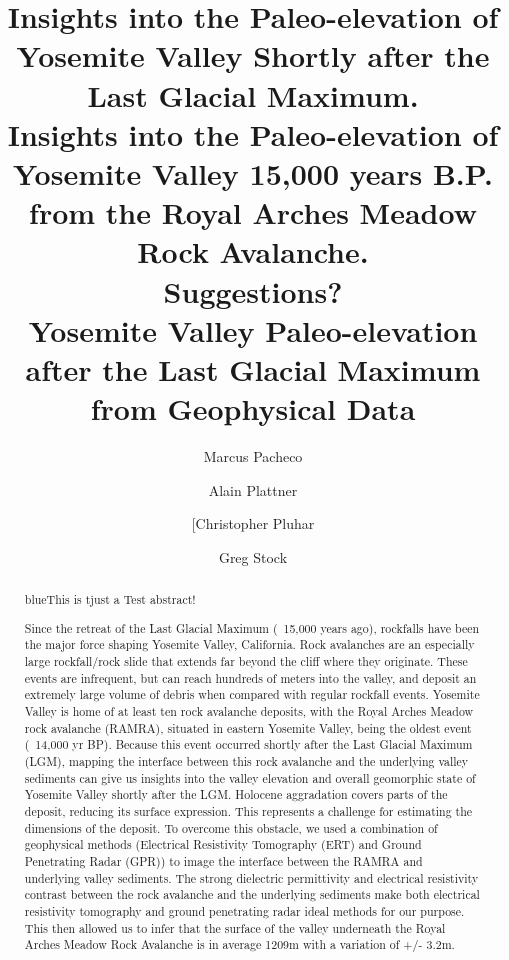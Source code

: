 \documentclass[5p]{elsarticle}
\newcommand{\COMON}{\begin{color}{blue}}
\newcommand{\COMOFF}{\end{color}}
\begin{document}
	\begin{frontmatter}

\title{Insights into the Paleo-elevation of Yosemite Valley Shortly after the Last Glacial Maximum.\\ \vspace{1cm}Insights into the Paleo-elevation of Yosemite Valley 15,000 years B.P. from the Royal Arches Meadow Rock Avalanche.\\ \vspace{1cm}Suggestions?\\ \vspace{1m}  Yosemite Valley Paleo-elevation  after the Last Glacial Maximum from Geophysical Data}

\author[Marcus]{Marcus Pacheco}
\address[Marcus]{California State University, Fresno}

\author[Alain]{Alain Plattner}
\address[Alain]{University of Alabama}

\author[Chris]{[Christopher Pluhar}
\address[Chris]{California State University, Fresno}

\author[Greg]{Greg Stock}
\address[Greg]{Yosemite National Park}



										\begin{abstract}
										
\COMON This is tjust a Test abstract!\COMOFF Since the retreat of the Last Glacial Maximum (~15,000 years ago), rockfalls have been the major force shaping Yosemite Valley, California. Rock avalanches are an especially large rockfall/rock slide that extends far beyond the cliff where they originate. These events are infrequent, but can reach hundreds of meters into the valley, and deposit an extremely large volume of debris when compared with regular rockfall events. Yosemite Valley is home of at least ten rock avalanche deposits, with the Royal Arches Meadow rock avalanche (RAMRA), situated in eastern Yosemite Valley, being the oldest event (~14,000 yr BP). Because this event occurred shortly after the Last Glacial Maximum (LGM), mapping the interface between this rock avalanche and the underlying valley sediments can give us insights into the valley elevation and overall geomorphic state of Yosemite Valley shortly after the LGM.  Holocene aggradation covers parts of the deposit, reducing its surface expression. This represents a challenge for estimating the dimensions of the deposit. To overcome this obstacle, we used a combination of geophysical methods (Electrical Resistivity Tomography (ERT) and Ground Penetrating Radar (GPR)) to image the interface between the RAMRA and underlying valley sediments. The strong dielectric permittivity and electrical resistivity contrast between the rock avalanche and the underlying sediments make both electrical resistivity tomography and ground penetrating radar ideal methods for our purpose. This then allowed us to infer that the surface of the valley underneath the Royal Arches Meadow Rock Avalanche is in average 1209m with a variation of +/- 3.2m.


\end{abstract}
\end{frontmatter}
\end{document}
